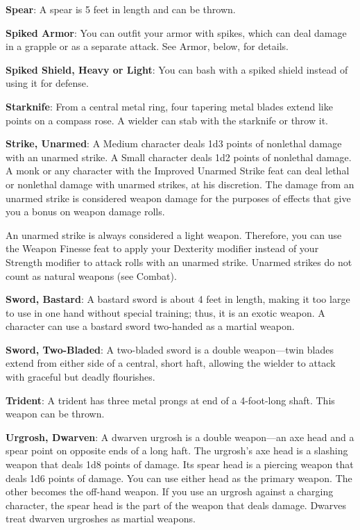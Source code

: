 \textbf{Spear}: A spear is 5 feet in length and can be thrown. 
		
\textbf{Spiked Armor}: You can outfit your armor with spikes, which can deal damage in a grapple or as a separate attack. See Armor, below, for details.
		
\textbf{Spiked Shield, Heavy or Light}: You can bash with a spiked shield instead of using it for defense.
		
\textbf{Starknife}: From a central metal ring, four tapering metal blades extend like points on a compass rose. A wielder can stab with the starknife or throw it. 
		
\textbf{Strike, Unarmed}: A Medium character deals 1d3 points of nonlethal damage with an unarmed strike. A Small character deals 1d2 points of nonlethal damage. A monk or any character with the Improved Unarmed Strike feat can deal lethal or nonlethal damage with unarmed strikes, at his discretion. The damage from an unarmed strike is considered weapon damage for the purposes of effects that give you a bonus on weapon damage rolls.
		
An unarmed strike is always considered a light weapon. Therefore, you can use the Weapon Finesse feat to apply your Dexterity modifier instead of your Strength modifier to attack rolls with an unarmed strike. Unarmed strikes do not count as natural weapons (see Combat).
		
\textbf{Sword, Bastard}: A bastard sword is about 4 feet in length, making it too large to use in one hand without special training; thus, it is an exotic weapon. A character can use a bastard sword two-handed as a martial weapon.
		
\textbf{Sword, Two-Bladed}: A two-bladed sword is a double weapon---twin blades extend from either side of a central, short haft, allowing the wielder to attack with graceful but deadly flourishes.
		
\textbf{Trident}: A trident has three metal prongs at end of a 4-foot-long shaft. This weapon can be thrown.
		
\textbf{Urgrosh, Dwarven}: A dwarven urgrosh is a double weapon---an axe head and a spear point on opposite ends of a long haft. The urgrosh's axe head is a slashing weapon that deals 1d8 points of damage. Its spear head is a piercing weapon that deals 1d6 points of damage. You can use either head as the primary weapon. The other becomes the off-hand weapon. If you use an urgrosh against a charging character, the spear head is the part of the weapon that deals damage. Dwarves treat dwarven urgroshes as martial weapons.
		

